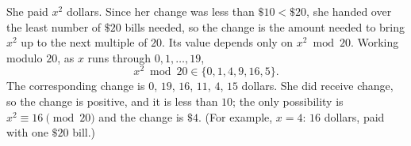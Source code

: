 She paid $x^2$ dollars. Since her change was less than $\$10<\$20$, she handed over the least number of $\$20$ bills needed, so the change is the amount needed to bring $x^2$ up to the next multiple of $20$. Its value depends only on $x^2\bmod 20$. Working modulo $20$, as $x$ runs through $0,1,\dots,19$,
\[
x^2\bmod20\in\{0,1,4,9,16,5\}.
\]
The corresponding change is $0$, $19$, $16$, $11$, $4$, $15$ dollars. She did receive change, so the change is positive, and it is less than $10$; the only possibility is $x^2\equiv16\pmod{20}$ and the change is $\boxed{\$4}$. (For example, $x=4$: $16$ dollars, paid with one $\$20$ bill.)
